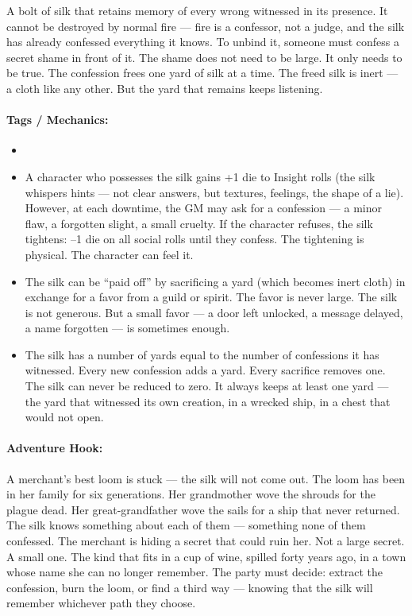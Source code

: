 A bolt of silk that retains memory of every wrong witnessed in its presence. It cannot be destroyed by normal fire --- fire is a confessor, not a judge, and the silk has already confessed everything it knows. To unbind it, someone must confess a secret shame in front of it. The shame does not need to be large. It only needs to be true. The confession frees one yard of silk at a time. The freed silk is inert --- a cloth like any other. But the yard that remains keeps listening.

\paragraph{Tags / Mechanics:}
\begin{itemize}
\item [TRUTH] [WITNESS] [BURDEN]
\item A character who possesses the silk gains +1 die to Insight rolls (the silk whispers hints --- not clear answers, but textures, feelings, the shape of a lie). However, at each downtime, the GM may ask for a confession --- a minor flaw, a forgotten slight, a small cruelty. If the character refuses, the silk tightens: --1 die on all social rolls until they confess. The tightening is physical. The character can feel it.
\item The silk can be ``paid off'' by sacrificing a yard (which becomes inert cloth) in exchange for a favor from a guild or spirit. The favor is never large. The silk is not generous. But a small favor --- a door left unlocked, a message delayed, a name forgotten --- is sometimes enough.
\item The silk has a number of yards equal to the number of confessions it has witnessed. Every new confession adds a yard. Every sacrifice removes one. The silk can never be reduced to zero. It always keeps at least one yard --- the yard that witnessed its own creation, in a wrecked ship, in a chest that would not open.
\end{itemize}

\paragraph{Adventure Hook:}
A merchant's best loom is stuck --- the silk will not come out. The loom has been in her family for six generations. Her grandmother wove the shrouds for the plague dead. Her great-grandfather wove the sails for a ship that never returned. The silk knows something about each of them --- something none of them confessed. The merchant is hiding a secret that could ruin her. Not a large secret. A small one. The kind that fits in a cup of wine, spilled forty years ago, in a town whose name she can no longer remember. The party must decide: extract the confession, burn the loom, or find a third way --- knowing that the silk will remember whichever path they choose.

